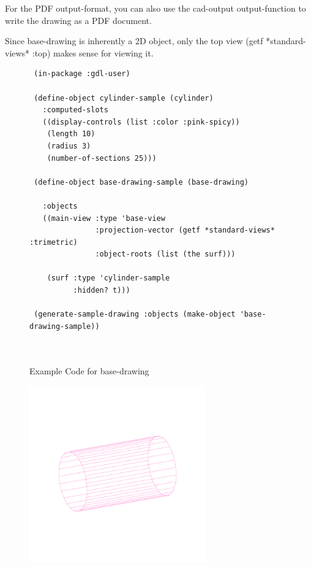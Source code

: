 \documentclass [11pt]{book}
\begin{document}
\begin{itemize}
\begin{description}
For the PDF output-format, you can also use the cad-output output-function to write the 
drawing as a PDF document. 

Since base-drawing is inherently a 2D object, only the top view (getf *standard-views* :top) 
makes sense for viewing it.



\end{description}




\begin{figure}
\begin{lrbox}{\boxedverb}
\begin{minipage}{\linewidth}
{\small

\begin{verbatim}
 (in-package :gdl-user)

 (define-object cylinder-sample (cylinder)
   :computed-slots
   ((display-controls (list :color :pink-spicy))
    (length 10)
    (radius 3)
    (number-of-sections 25)))

 (define-object base-drawing-sample (base-drawing)
  
   :objects
   ((main-view :type 'base-view
               :projection-vector (getf *standard-views* :trimetric)
               :object-roots (list (the surf)))
 
    (surf :type 'cylinder-sample
          :hidden? t))) 

 (generate-sample-drawing :objects (make-object 'base-drawing-sample))                

 
\end{verbatim}}
\end{minipage}
\end{lrbox}
\fbox{\usebox{\boxedverb}}

\caption{Example Code for base-drawing}

\label{fig:example-code-base-drawing}

\end{figure}

\begin{figure}
\begin{center}
\includegraphics[width=3in,height=3in]{../images/example-base-drawing.pdf}
\end{center}


\end{figure}
\end{itemize}
\end{document}
